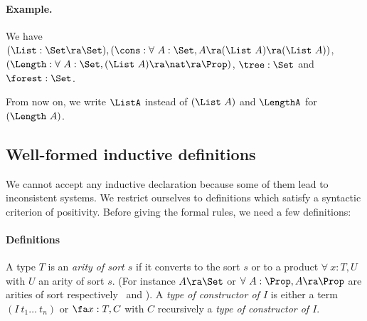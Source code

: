 \paragraph{Example.}
We have $(\List:\Set \ra \Set), (\cons:\forall~A:\Set,A\ra(\List~A)\ra
(\List~A))$, \\ 
$(\Length:\forall~A:\Set, (\List~A)\ra\nat\ra\Prop)$, $\tree:\Set$ and $\forest:\Set$.

From now on, we write $\ListA$ instead of $(\List~A)$ and $\LengthA$
for $(\Length~A)$.



\subsection{Well-formed inductive definitions}
We cannot accept any inductive declaration because some of them lead
to inconsistent systems. We restrict ourselves to definitions which
satisfy a syntactic criterion of positivity. Before giving the formal
rules, we need a few definitions:

\paragraph[Definitions]{Definitions\label{Positivity}}

A type $T$ is an {\em arity of sort $s$} if it converts
to the sort $s$ or to a product $\forall~x:T,U$ with $U$ an arity
of sort $s$. (For instance $A\ra \Set$ or $\forall~A:\Prop,A\ra
\Prop$ are arities of sort respectively \Set\ and \Prop).  A {\em type
  of constructor of $I$} is either a term
$(I~t_1\ldots ~t_n)$ or $\fa x:T,C$ with $C$ recursively 
a {\em type of constructor of $I$}.

